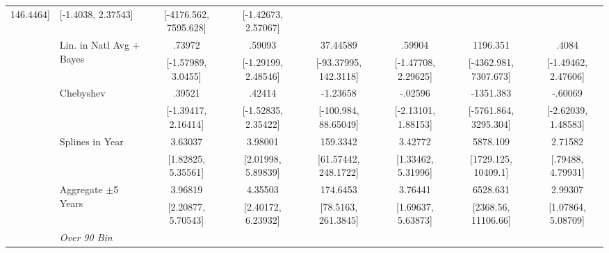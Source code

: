 \begin{landscape}
\begin{table}[htb]
\begin{threeparttable}
{\begin{tabular}{llcccccc}
146.4464] & [-1.4038, 2.37543] & [-4176.562, 7595.628] & [-1.42673, 2.57067] \\ & \multirow{2}{*}{Lin. in Natl Avg + Bayes} & .73972 & .59093 & 37.44589 & .59904 & 1196.351 & .4084 \\  & & [-1.57989, 3.0455] & [-1.29199, 2.48546] & [-93.37995, 142.3118] & [-1.47708, 2.29625] & [-4362.981, 7307.673] & [-1.49462, 2.47606] \\ & \multirow{2}{*}{Chebyshev} & .39521 & .42414 & -1.23658 & -.02596 & -1351.383 & -.60069 \\  & & [-1.39417, 2.16414] & [-1.52835, 2.35422] & [-100.984, 88.65049] & [-2.13101, 1.88153] & [-5761.864, 3295.304] & [-2.62039, 1.48583] \\ & \multirow{2}{*}{Splines in Year} & 3.63037 & 3.98001 & 159.3342 & 3.42772 & 5878.109 & 2.71582 \\  & & [1.82825, 5.35561] & [2.01998, 5.89839] & [61.57442, 248.1722] & [1.33462, 5.31996] & [1729.125, 10409.1] & [.79488, 4.79931] \\ & \multirow{2}{*}{Aggregate \(\pm\)5 Years} & 3.96819 & 4.35503 & 174.6453 & 3.76441 & 6528.631 & 2.99307 \\  & & [2.20877, 5.70543] & [2.40172, 6.23932] & [78.5163, 261.3845] & [1.69637, 5.63873] & [2368.56, 11106.66] & [1.07864, 5.08709] \\
\cmidrule(lr){2-8}  & \textit{Over 90 Bin} \\

\end{tabular}}
\end{threeparttable}
\end{table}
\end{landscape}

